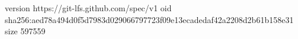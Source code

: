 version https://git-lfs.github.com/spec/v1
oid sha256:aed78a494d0f5d7983d029066797723f09e13ecadedaf42a2208d2b61b158e31
size 597559

